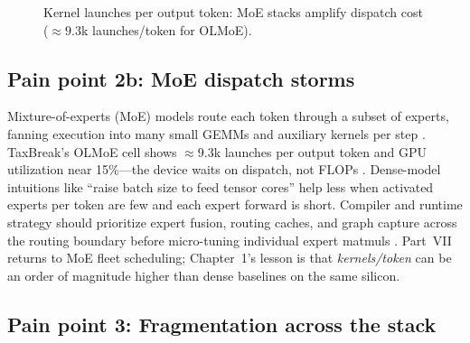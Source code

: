 \begin{figure}[t]
\centering
{}
\caption{Kernel launches per output token: MoE stacks amplify dispatch cost (${\approx}9.3$k launches/token for OLMoE).}
\label{fig:kernels_per_token_bars}
\end{figure}


\subsection{Pain point 2b: MoE dispatch storms}
Mixture-of-experts (MoE) models route each token through a subset of experts, fanning execution into many small GEMMs and auxiliary kernels per step \citep{taxbreak2026,wang2025decoupledanalysiso}.
TaxBreak's OLMoE cell shows ${\approx}9.3$k launches per output token and GPU utilization near 15\%---the device waits on dispatch, not FLOPs \citep{taxbreak2026}.
Dense-model intuitions like ``raise batch size to feed tensor cores'' help less when activated experts per token are few and each expert forward is short.
Compiler and runtime strategy should prioritize expert fusion, routing caches, and graph capture across the routing boundary before micro-tuning individual expert matmuls \citep{taxbreak2026,yirage2026}.
Part~VII returns to MoE fleet scheduling; Chapter~1's lesson is that \emph{kernels/token} can be an order of magnitude higher than dense baselines on the same silicon.

\subsection{Pain point 3: Fragmentation across the stack}

